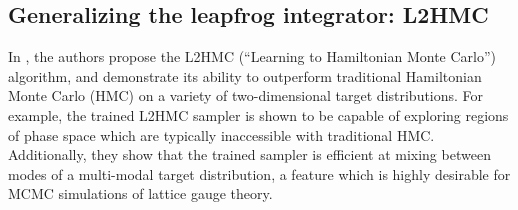 \documentclass{article} %
\begin{document}
{\subsection{\label{sec:l2hmc}Generalizing the leapfrog integrator: L2HMC}
%
%
%

In \citep{levy2017}, the authors propose the L2HMC (``Learning to Hamiltonian Monte Carlo'') algorithm, and demonstrate
its ability to outperform traditional Hamiltonian Monte Carlo (HMC) on a variety of two-dimensional target
distributions.
%
For example, the trained L2HMC sampler is shown to be capable of exploring regions of phase space which are typically
inaccessible with traditional HMC.\@
%
Additionally, they show that the trained sampler is efficient at mixing between modes of a multi-modal target
distribution, a feature which is highly desirable for MCMC simulations of lattice gauge theory.
%


}
\end{document}
